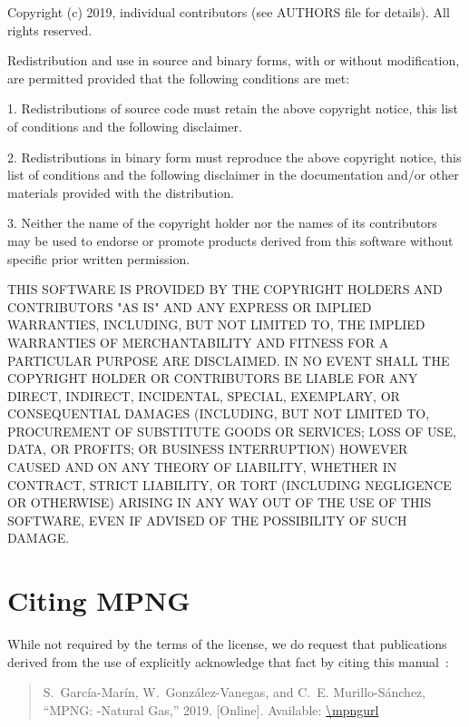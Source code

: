 \begin{Notice}
Copyright (c) 2019, individual contributors (see AUTHORS file for 
details). All rights reserved.

Redistribution and use in source and binary forms, with or without
modification, are permitted provided that the following conditions
are met:

1. Redistributions of source code must retain the above copyright
notice, this list of conditions and the following disclaimer.

2. Redistributions in binary form must reproduce the above copyright
notice, this list of conditions and the following disclaimer in the
documentation and/or other materials provided with the distribution.

3. Neither the name of the copyright holder nor the names of its
contributors may be used to endorse or promote products derived from
this software without specific prior written permission.

THIS SOFTWARE IS PROVIDED BY THE COPYRIGHT HOLDERS AND CONTRIBUTORS
"AS IS" AND ANY EXPRESS OR IMPLIED WARRANTIES, INCLUDING, BUT NOT
LIMITED TO, THE IMPLIED WARRANTIES OF MERCHANTABILITY AND FITNESS
FOR A PARTICULAR PURPOSE ARE DISCLAIMED. IN NO EVENT SHALL THE
COPYRIGHT HOLDER OR CONTRIBUTORS BE LIABLE FOR ANY DIRECT, INDIRECT,
INCIDENTAL, SPECIAL, EXEMPLARY, OR CONSEQUENTIAL DAMAGES (INCLUDING,
BUT NOT LIMITED TO, PROCUREMENT OF SUBSTITUTE GOODS OR SERVICES;
LOSS OF USE, DATA, OR PROFITS; OR BUSINESS INTERRUPTION) HOWEVER
CAUSED AND ON ANY THEORY OF LIABILITY, WHETHER IN CONTRACT, STRICT
LIABILITY, OR TORT (INCLUDING NEGLIGENCE OR OTHERWISE) ARISING IN
ANY WAY OUT OF THE USE OF THIS SOFTWARE, EVEN IF ADVISED OF THE
POSSIBILITY OF SUCH DAMAGE.
\end{Notice}

\section{Citing MPNG}
\label{sec:citing_MPNG}

While not required by the terms of the license, we do request that publications derived from the use of \mpng{} explicitly acknowledge that fact by citing this manual~\cite{mpng2019}:

\begin{quote}
	\small
	S.~García-Marín, W.~González-Vanegas, and C.~E. Murillo-Sánchez, ``MPNG: \matpower{}-Natural Gas,'' 2019.
	[Online]. Available: \url{\mpngurl}
\end{quote}